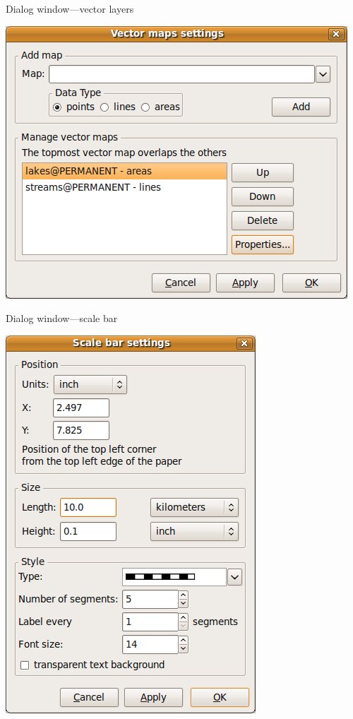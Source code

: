 \documentclass[xcolor=dvipsnames,beamer,compress]{beamer} %
\begin{document}
\begin{frame}{Dialog window---vector layers}
\begin{center}
\includegraphics[height=0.8\textheight]{./screenshoty/vector.png}
\end{center}
\end{frame}

\begin{frame}{Dialog window---scale bar}
\begin{center}
\includegraphics[height=0.8\textheight]{./screenshoty/scalebar.png}
\end{center}
\end{frame}
\end{document}
